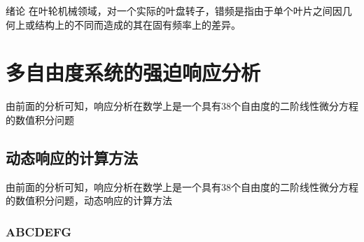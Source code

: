 
\begin{mchapter}{绪论}
    在叶轮机械领域，对一个实际的叶盘转子，错频是指由于单个叶片之间因几何上或结构上的不同而造成的其在固有频率上的差异。
    \section{多自由度系统的强迫响应分析}
    由前面的分析可知，响应分析在数学上是一个具有38个自由度的二阶线性微分方程的数值积分问题
    \subsection{动态响应的计算方法}
    由前面的分析可知，响应分析在数学上是一个具有38个自由度的二阶线性微分方程的数值积分问题，动态响应的计算方法
    \subsubsection{ABCDEFG}
\end{mchapter}